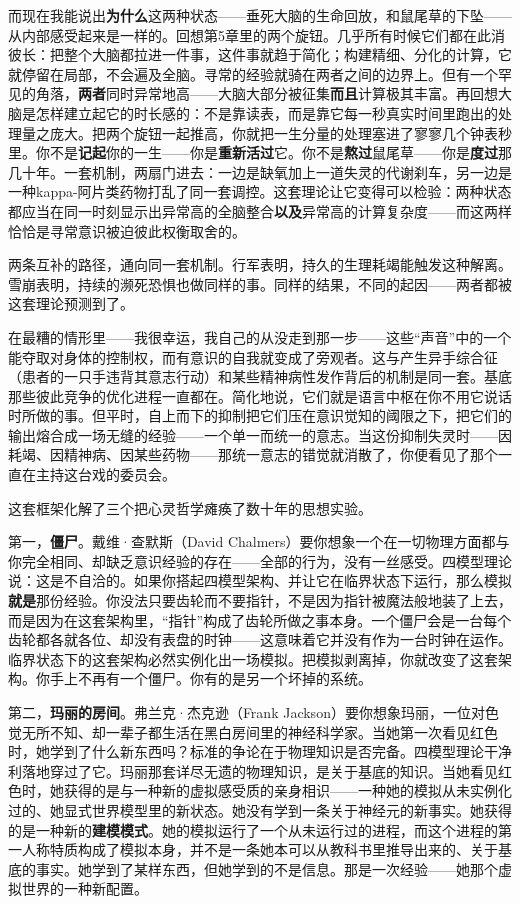 \documentclass[11pt, twoside, openright]{book}
\begin{document}
而现在我能说出\textbf{为什么}这两种状态------垂死大脑的生命回放，和鼠尾草的下坠------从内部感受起来是一样的。回想第5章里的两个旋钮。几乎所有时候它们都在此消彼长：把整个大脑都拉进一件事，这件事就趋于简化；构建精细、分化的计算，它就停留在局部，不会遍及全脑。寻常的经验就骑在两者之间的边界上。但有一个罕见的角落，\textbf{两者}同时异常地高------大脑大部分被征集\textbf{而且}计算极其丰富。再回想大脑是怎样建立起它的时长感的：不是靠读表，而是靠它每一秒真实时间里跑出的处理量之庞大。把两个旋钮一起推高，你就把一生分量的处理塞进了寥寥几个钟表秒里。你不是\textbf{记起}你的一生------你是\textbf{重新活过}它。你不是\textbf{熬过}鼠尾草------你是\textbf{度过}那几十年。一套机制，两扇门进去：一边是缺氧加上一道失灵的代谢刹车，另一边是一种kappa-阿片类药物打乱了同一套调控。这套理论让它变得可以检验：两种状态都应当在同一时刻显示出异常高的全脑整合\textbf{以及}异常高的计算复杂度------而这两样恰恰是寻常意识被迫彼此权衡取舍的。

两条互补的路径，通向同一套机制。行军表明，持久的生理耗竭能触发这种解离。雪崩表明，持续的濒死恐惧也做同样的事。同样的结果，不同的起因------两者都被这套理论预测到了。

在最糟的情形里------我很幸运，我自己的从没走到那一步------这些“声音”中的一个能夺取对身体的控制权，而有意识的自我就变成了旁观者。这与产生异手综合征（患者的一只手违背其意志行动）和某些精神病性发作背后的机制是同一套。基底那些彼此竞争的优化进程一直都在。简化地说，它们就是语言中枢在你不用它说话时所做的事。但平时，自上而下的抑制把它们压在意识觉知的阈限之下，把它们的输出熔合成一场无缝的经验------一个单一而统一的意志。当这份抑制失灵时------因耗竭、因精神病、因某些药物------那统一意志的错觉就消散了，你便看见了那个一直在主持这台戏的委员会。

这套框架化解了三个把心灵哲学瘫痪了数十年的思想实验。

第一，\textbf{僵尸}。戴维·查默斯（David Chalmers）要你想象一个在一切物理方面都与你完全相同、却缺乏意识经验的存在------全部的行为，没有一丝感受。四模型理论说：这是不自洽的。如果你搭起四模型架构、并让它在临界状态下运行，那么模拟\textbf{就是}那份经验。你没法只要齿轮而不要指针，不是因为指针被魔法般地装了上去，而是因为在这套架构里，“指针”构成了齿轮所做之事本身。一个僵尸会是一台每个齿轮都各就各位、却没有表盘的时钟------这意味着它并没有作为一台时钟在运作。临界状态下的这套架构必然实例化出一场模拟。把模拟剥离掉，你就改变了这套架构。你手上不再有一个僵尸。你有的是另一个坏掉的系统。

第二，\textbf{玛丽的房间}。弗兰克·杰克逊（Frank Jackson）要你想象玛丽，一位对色觉无所不知、却一辈子都生活在黑白房间里的神经科学家。当她第一次看见红色时，她学到了什么新东西吗？标准的争论在于物理知识是否完备。四模型理论干净利落地穿过了它。玛丽那套详尽无遗的物理知识，是关于基底的知识。当她看见红色时，她获得的是与一种新的虚拟感受质的亲身相识------一种她的模拟从未实例化过的、她显式世界模型里的新状态。她没有学到一条关于神经元的新事实。她获得的是一种新的\textbf{建模模式}。她的模拟运行了一个从未运行过的进程，而这个进程的第一人称特质构成了模拟本身，并不是一条她本可以从教科书里推导出来的、关于基底的事实。她学到了某样东西，但她学到的不是信息。那是一次经验------她那个虚拟世界的一种新配置。
\end{document}
